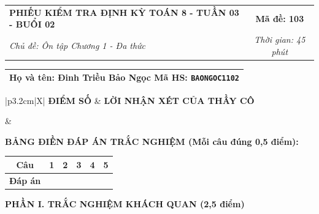 \documentclass[12pt,a4paper]{article}
\begin{document}
\newpage


\noindent
\begin{tabularx}{\linewidth}{|X|c|}
\hline
\textbf{PHIẾU KIỂM TRA ĐỊNH KỲ TOÁN 8 - TUẦN 03 - BUỔI 02} & \textbf{Mã đề: 103} \\
\textit{Chủ đề: Ôn tập Chương 1 - Đa thức} & \textit{Thời gian: 45 phút} \\
\hline
\end{tabularx}

\vspace{1mm}

\noindent
\begin{tabularx}{\linewidth}{|X|}
\hline
\rule[-2mm]{0pt}{7.5mm}\textbf{Họ và tên:} \textbf{\large Đinh Triều Bảo Ngọc} \hfill \textbf{Mã HS:} \texttt{BAONGOC1102} \quad \\
\hline
\end{tabularx}

\vspace{1mm}

\noindent
\begin{tabularx}{\linewidth}{|p{3.2cm}|X|}
\hline
\centering\textbf{ĐIỂM SỐ} & \centering\textbf{LỜI NHẬN XÉT CỦA THẦY CÔ} \tabularnewline
\hline
\rule{0pt}{1.3cm} & \tabularnewline
\hline
\end{tabularx}

\vspace{1.2mm}

\noindent\textbf{BẢNG ĐIỀN ĐÁP ÁN TRẮC NGHIỆM (Mỗi câu đúng 0,5 điểm):}
\vspace{0.8mm}

\noindent
\renewcommand{\arraystretch}{1.35}
\begin{tabularx}{\linewidth}{|c|*{5}{>{\centering\arraybackslash}X|}}
\hline
\textbf{Câu} & \textbf{1} & \textbf{2} & \textbf{3} & \textbf{4} & \textbf{5} \\
\hline
\textbf{Đáp án} & & & & & \\
\hline
\end{tabularx}
\renewcommand{\arraystretch}{1.0}

\vspace{1.5mm}

\noindent\textbf{\large PHẦN I. TRẮC NGHIỆM KHÁCH QUAN (2,5 điểm)}
\vspace{1mm}
\end{document}
